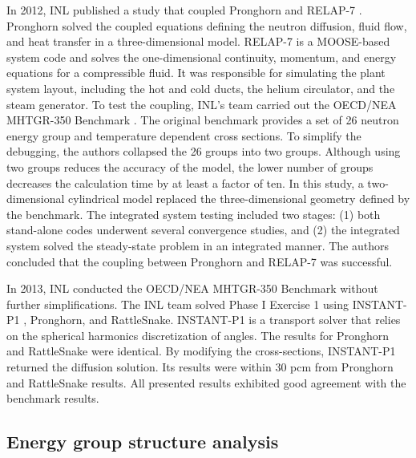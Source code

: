 In 2012, \gls{INL} published a study \cite{j_ortensi_initial_2012} that coupled Pronghorn and RELAP-7 \cite{andrs_relap-7_2012}.
Pronghorn solved the coupled equations defining the neutron diffusion, fluid flow, and heat transfer in a three-dimensional model.
RELAP-7 is a MOOSE-based system code and solves the one-dimensional continuity, momentum, and energy equations for a compressible fluid.
It was responsible for simulating the plant system layout, including the hot and cold ducts, the helium circulator, and the steam generator.
To test the coupling, INL's team carried out the OECD/NEA MHTGR-350 Benchmark \cite{oecd_nea_coupled_2020}.
The original benchmark provides a set of 26 neutron energy group and temperature dependent cross sections.
To simplify the debugging, the authors collapsed the 26 groups into two groups.
Although using two groups reduces the accuracy of the model, the lower number of groups decreases the calculation time by at least a factor of ten.
In this study, a two-dimensional cylindrical model replaced the three-dimensional geometry defined by the benchmark.
The integrated system testing included two stages: (1) both stand-alone codes underwent several convergence studies, and (2) the integrated system solved the steady-state problem in an integrated manner.
The authors concluded that the coupling between Pronghorn and RELAP-7 was successful.

In 2013, \gls{INL} conducted the OECD/NEA MHTGR-350 Benchmark \cite{strydom_inl_2013} without further simplifications.
The \gls{INL} team solved Phase I Exercise 1 using INSTANT-P1 \cite{wang_krylov_2011}, Pronghorn, and RattleSnake.
INSTANT-P1 is a transport solver that relies on the spherical harmonics discretization of angles.
The results for Pronghorn and RattleSnake were identical.
By modifying the cross-sections, INSTANT-P1 returned the diffusion solution.
Its results were within 30 pcm from Pronghorn and RattleSnake results.
All presented results exhibited good agreement with the benchmark results.

\subsection{Energy group structure analysis}

